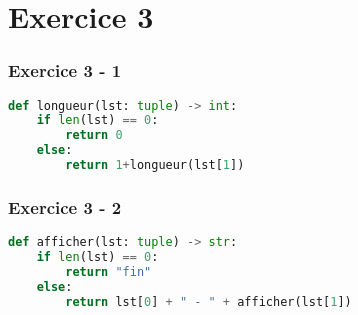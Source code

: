 \documentclass[svgnames,11pt]{beamer}
\begin{document}
\section{Exercice 3}
\begin{frame}[fragile]
    \frametitle{Exercice 3 - 1}

\begin{lstlisting}[language=Python , basicstyle=\ttfamily\small, xleftmargin=2em, xrightmargin=2em]
def longueur(lst: tuple) -> int:
    if len(lst) == 0:
        return 0
    else:
        return 1+longueur(lst[1])
\end{lstlisting}    

\end{frame}
\begin{frame}[fragile]
    \frametitle{Exercice 3 - 2}

\begin{lstlisting}[language=Python , basicstyle=\ttfamily\small, xleftmargin=1em, xrightmargin=1em]
def afficher(lst: tuple) -> str:
    if len(lst) == 0:
        return "fin"
    else:
        return lst[0] + " - " + afficher(lst[1])
\end{lstlisting}    

\end{frame}
\end{document}
